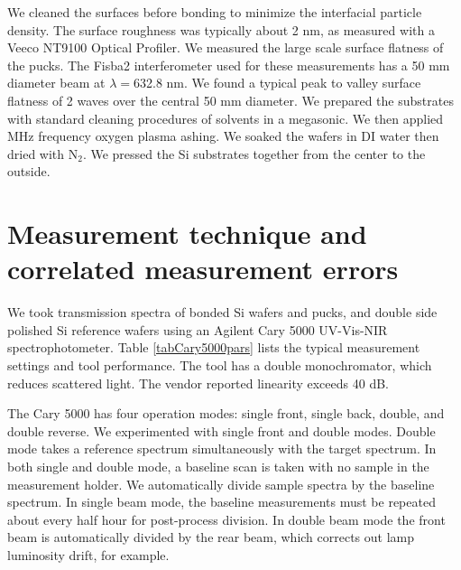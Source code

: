 \documentclass[osajnl,preprint,showpacs,superscriptaddress,12pt]{revtex4-1} %
\begin{document}
We cleaned the surfaces before bonding to minimize the interfacial particle density.  The surface roughness was typically about 2 nm, as measured with a Veeco NT9100 Optical Profiler.  We measured the large scale surface flatness of the pucks.  The Fisba2 interferometer used for these measurements has a 50 mm diameter beam at $\lambda=$632.8 nm.  We found a typical peak to valley surface flatness of 2 waves over the central 50 mm diameter.  We prepared the substrates with standard cleaning procedures of solvents in a megasonic.  We then applied MHz frequency oxygen plasma ashing.  We soaked the wafers in DI water then dried with N$_2$.  We pressed the Si substrates together from the center to the outside.


\section{Measurement technique and correlated measurement errors}
\label{sec_aboutErrors}
We took transmission spectra of bonded Si wafers and pucks, and double side polished Si reference wafers using an Agilent Cary 5000 UV-Vis-NIR spectrophotometer.  Table \ref{tabCary5000pars} lists the typical measurement settings and tool performance.  The tool has a double monochromator, which reduces scattered light.  The vendor reported linearity exceeds 40 dB.

The Cary 5000 has four operation modes: single front, single back, double, and double reverse.  We experimented with single front and double modes.  Double mode takes a reference spectrum simultaneously with the target spectrum.  In both single and double mode, a baseline scan is taken with no sample in the measurement holder.  We automatically divide sample spectra by the baseline spectrum.  In single beam mode, the baseline measurements must be repeated about every half hour for post-process division.  In double beam mode the front beam is automatically divided by the rear beam, which corrects out lamp luminosity drift, for example.  
\end{document}
